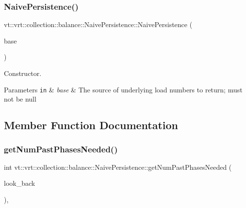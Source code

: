 \subsubsection{\texorpdfstring{Naive\+Persistence()}{NaivePersistence()}}
{\footnotesize\ttfamily vt\+::vrt\+::collection\+::balance\+::\+Naive\+Persistence\+::\+Naive\+Persistence (\begin{DoxyParamCaption}\item[{std\+::shared\+\_\+ptr$<$ \hyperlink{classvt_1_1vrt_1_1collection_1_1balance_1_1_load_model}{balance\+::\+Load\+Model} $>$}]{base }\end{DoxyParamCaption})\hspace{0.3cm}{\ttfamily [explicit]}}



Constructor. 


\begin{DoxyParams}[1]{Parameters}
\mbox{\tt in}  & {\em base} & The source of underlying load numbers to return; must not be null \\
\hline
\end{DoxyParams}


\subsection{Member Function Documentation}
\mbox{\label{structvt_1_1vrt_1_1collection_1_1balance_1_1_naive_persistence_abf20213225a6a25ed7cf119c7a86d834}} 
\subsubsection{\texorpdfstring{get\+Num\+Past\+Phases\+Needed()}{getNumPastPhasesNeeded()}}
{\footnotesize\ttfamily int vt\+::vrt\+::collection\+::balance\+::\+Naive\+Persistence\+::get\+Num\+Past\+Phases\+Needed (\begin{DoxyParamCaption}\item[{int}]{look\+\_\+back }\end{DoxyParamCaption})\hspace{0.3cm}{\ttfamily [override]}, {\ttfamily [virtual]}}



